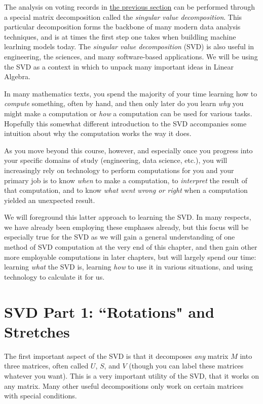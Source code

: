 \documentclass{ximera}
\begin{document}
The analysis on voting records in \href{https://ximera.osu.edu/appliedlinearalgebra/c6ChapterSix/learningActivities/m6LearningActivities/leastSquares/leastSquaresApplicationVotingImages}{the previous section} can be performed through a special matrix decomposition called the \emph{singular value decomposition}. This particular decomposition forms the backbone of many modern data analysis techniques, and is at times the first step one takes when buildling machine learlning models today. The \emph{singular value decomposition} (SVD) is also useful in engineering, the sciences, and many software-based applications. We will be using the SVD as a context in which to unpack many important ideas in Linear Algebra.

In many mathematics texts, you spend the majority of your time learning how to \emph{compute} something, often by hand, and then only later do you learn \emph{why} you might make a computation or \emph{how} a computation can be used for various tasks. Hopefully this somewhat different introduction to the SVD accompanies some intuition about why the computation works the way it does. 

As you move beyond this course, however, and especially once you progress into your specific domains of study (engineering, data science, etc.), you will increasingly rely on technology to perform computations for you and your primary job is to know \emph{when} to make a computation, to \emph{interpret} the result of that computation, and to know \emph{what went wrong or right} when a computation yielded an unexpected result. 

We will foreground this latter approach to learning the SVD. In many respects, we have already been employing these emphases already, but this focus will be especially true for the SVD as we will gain a general understanding of one method of SVD computation at the very end of this chapter, and then gain other more employable computations in later chapters, but will largely spend our time: learning \emph{what} the SVD is, learning \emph{how} to use it in various situations, and using technology to calculate it for us.

\section*{SVD Part 1: ``Rotations" and Stretches}

The first important aspect of the SVD is that it decomposes \emph{any} matrix $M$ into three matrices, often called $U$, $S$, and $V$ (though you can label these matrices whatever you want). This is a very important utility of the SVD, that it works on any matrix. Many other useful decompositions only work on certain matrices with special conditions.
\end{document}
